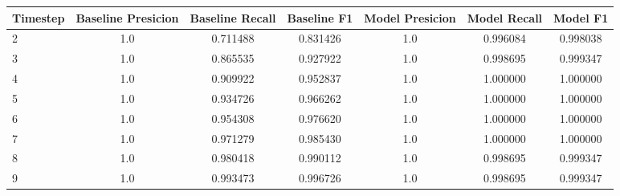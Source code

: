 \begin{tabular}{lcccccc}
\toprule
 Timestep &  Baseline Presicion &  Baseline Recall &  Baseline F1 &  Model Presicion &  Model Recall &  Model F1 \\
\midrule
        2 &                 1.0 &         0.711488 &     0.831426 &              1.0 &      0.996084 &  0.998038 \\
        3 &                 1.0 &         0.865535 &     0.927922 &              1.0 &      0.998695 &  0.999347 \\
        4 &                 1.0 &         0.909922 &     0.952837 &              1.0 &      1.000000 &  1.000000 \\
        5 &                 1.0 &         0.934726 &     0.966262 &              1.0 &      1.000000 &  1.000000 \\
        6 &                 1.0 &         0.954308 &     0.976620 &              1.0 &      1.000000 &  1.000000 \\
        7 &                 1.0 &         0.971279 &     0.985430 &              1.0 &      1.000000 &  1.000000 \\
        8 &                 1.0 &         0.980418 &     0.990112 &              1.0 &      0.998695 &  0.999347 \\
        9 &                 1.0 &         0.993473 &     0.996726 &              1.0 &      0.998695 &  0.999347 \\
\bottomrule
\end{tabular}
